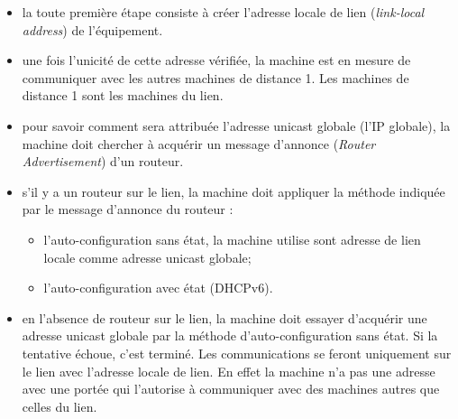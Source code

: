 \begin{itemize}
  \item la toute première étape consiste à créer l'adresse locale de lien (\textit{link-local address}) de l’équipement.
  \item une fois l'unicité de cette adresse vérifiée, la machine est en mesure de communiquer avec les autres machines de distance 1. Les machines de distance 1 sont les machines du lien.
  \item pour savoir comment sera attribuée l’adresse unicast globale (l’IP globale), la machine doit chercher à acquérir un message d'annonce (\textit{Router Advertisement}) d’un routeur.
  \item s'il y a un routeur sur le lien, la machine doit appliquer la méthode indiquée par le message d'annonce du routeur :
    \begin{itemize}
      \item l'auto-configuration sans état, la machine utilise sont adresse de lien locale comme adresse unicast globale;
      \item l'auto-configuration avec état (DHCPv6).
    \end{itemize}
  \item en l'absence de routeur sur le lien, la machine doit essayer d'acquérir une adresse unicast globale par la méthode d'auto-configuration sans état. Si la tentative échoue, c'est terminé. Les communications se feront uniquement sur le lien avec l'adresse locale de lien. En effet la machine n'a pas une adresse avec une portée qui l'autorise à communiquer avec des machines autres que celles du lien.
\end{itemize}

